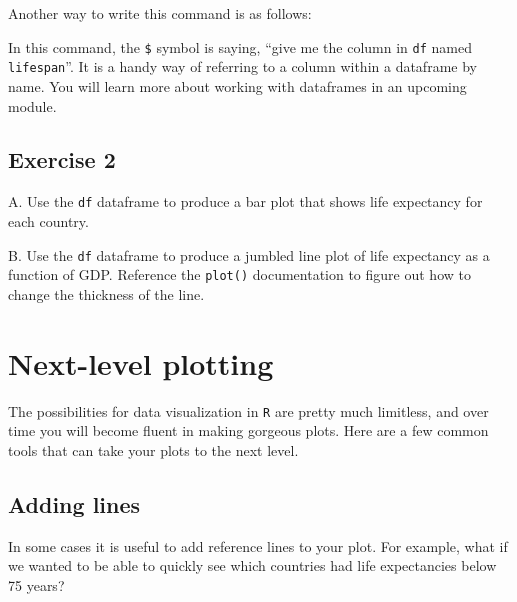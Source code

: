 \documentclass[
]{book}
\newenvironment{Shaded}{\begin{snugshade}}{\end{snugshade}}
\newcommand{\KeywordTok}[1]{\textcolor[rgb]{0.13,0.29,0.53}{\textbf{#1}}}
\newcommand{\NormalTok}[1]{#1}
\newcommand{\OperatorTok}[1]{\textcolor[rgb]{0.81,0.36,0.00}{\textbf{#1}}}
\newcommand{\StringTok}[1]{\textcolor[rgb]{0.31,0.60,0.02}{#1}}
\begin{document}
Another way to write this command is as follows:

\begin{Shaded}
\end{Shaded}

In this command, the \texttt{\$} symbol is saying, ``give me the column in \texttt{df} named \texttt{lifespan}''. It is a handy way of referring to a column within a dataframe by name. You will learn more about working with dataframes in an upcoming module.

\hypertarget{exercise-2-4}{%
\subsection*{Exercise 2}\label{exercise-2-4}}

A. Use the \texttt{df} dataframe to produce a bar plot that shows life expectancy for each country.

B. Use the \texttt{df} dataframe to produce a jumbled line plot of life expectancy as a function of GDP. Reference the \texttt{plot()} documentation to figure out how to change the thickness of the line.

\hypertarget{next-level-plotting}{%
\section*{Next-level plotting}\label{next-level-plotting}}

The possibilities for data visualization in \texttt{R} are pretty much limitless, and over time you will become fluent in making gorgeous plots. Here are a few common tools that can take your plots to the next level.

\hypertarget{adding-lines}{%
\subsection*{Adding lines}\label{adding-lines}}

In some cases it is useful to add reference lines to your plot. For example, what if we wanted to be able to quickly see which countries had life expectancies below 75 years?
\end{document}
